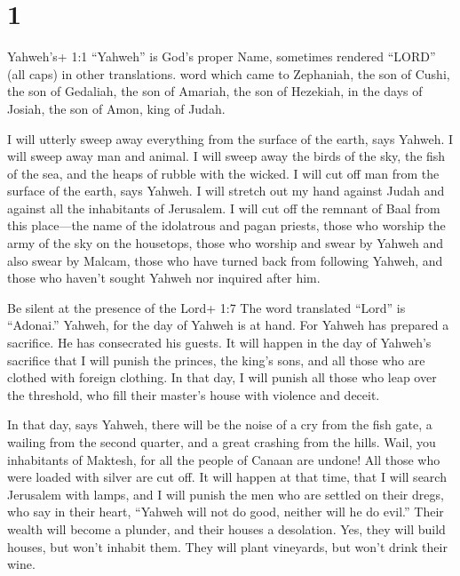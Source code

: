 \hypertarget{section}{%
\section{1}\label{section}}

 Yahweh's+ 1:1 ``Yahweh'' is God's proper Name, sometimes
rendered ``LORD'' (all caps) in other translations. word which came to
Zephaniah, the son of Cushi, the son of Gedaliah, the son of Amariah,
the son of Hezekiah, in the days of Josiah, the son of Amon, king of
Judah.

 I will utterly sweep away everything from the surface of
the earth, says Yahweh.  I will sweep away man and animal. I
will sweep away the birds of the sky, the fish of the sea, and the heaps
of rubble with the wicked. I will cut off man from the surface of the
earth, says Yahweh.  I will stretch out my hand against
Judah and against all the inhabitants of Jerusalem. I will cut off the
remnant of Baal from this place---the name of the idolatrous and pagan
priests,  those who worship the army of the sky on the
housetops, those who worship and swear by Yahweh and also swear by
Malcam,  those who have turned back from following Yahweh,
and those who haven't sought Yahweh nor inquired after him.

 Be silent at the presence of the Lord+ 1:7 The word
translated ``Lord'' is ``Adonai.'' Yahweh, for the day of Yahweh is at
hand. For Yahweh has prepared a sacrifice. He has consecrated his
guests.  It will happen in the day of Yahweh's sacrifice
that I will punish the princes, the king's sons, and all those who are
clothed with foreign clothing.  In that day, I will punish
all those who leap over the threshold, who fill their master's house
with violence and deceit.

 In that day, says Yahweh, there will be the noise of a cry
from the fish gate, a wailing from the second quarter, and a great
crashing from the hills.  Wail, you inhabitants of Maktesh,
for all the people of Canaan are undone! All those who were loaded with
silver are cut off.  It will happen at that time, that I
will search Jerusalem with lamps, and I will punish the men who are
settled on their dregs, who say in their heart, ``Yahweh will not do
good, neither will he do evil.''  Their wealth will become
a plunder, and their houses a desolation. Yes, they will build houses,
but won't inhabit them. They will plant vineyards, but won't drink their
wine.

